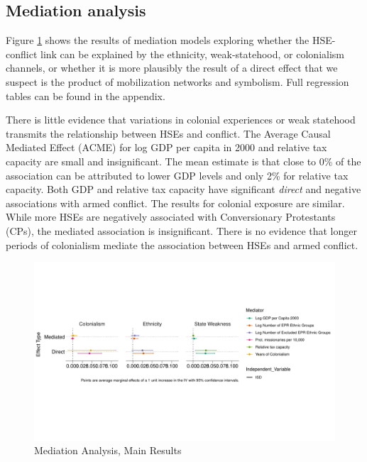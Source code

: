 
\subsection{Mediation analysis}

Figure \ref{Fig: Mediation} shows the results of mediation models exploring
whether the HSE-conflict link can be explained by the ethnicity, weak-statehood,
or colonialism channels, or whether it is more plausibly the result of a direct
effect that we suspect is the product of mobilization networks and symbolism.
Full regression tables can be found in the appendix.

There is little evidence that variations in colonial experiences or weak
statehood transmits the relationship between HSEs and conflict. The Average
Causal Mediated Effect (ACME) for log GDP per capita in 2000 and relative tax
capacity are small and insignificant. The mean estimate is that close to 0\% of
the association can be attributed to lower GDP levels and only 2\% for relative
tax capacity. Both GDP and relative tax capacity have significant
\textit{direct} and negative associations with armed conflict. The results for
colonial exposure are similar. While more HSEs are negatively associated with
Conversionary Protestants (CPs), the mediated association is insignificant.
There is no evidence that longer periods of colonialism mediate the association
between HSEs and armed conflict.   

\begin{figure}[!htb] 
	\includegraphics[width=\textwidth]{img/mediation_plot.pdf}
	\caption{Mediation Analysis, Main Results} 
	\label{Fig: Mediation} 
\end{figure}

